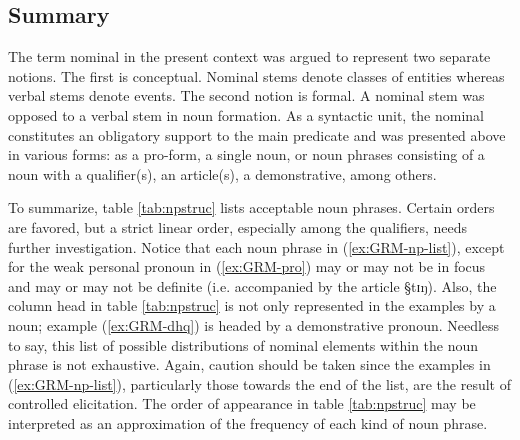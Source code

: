 \subsection{Summary}
\label{sec:GRM-NP-sum}

The term nominal in the present context was argued to represent two separate
notions. The first is  conceptual. Nominal stems denote classes of entities
whereas verbal stems denote events. The second notion is  formal. A nominal stem
was opposed to  a verbal stem in noun formation.  As a syntactic unit,  the
nominal  constitutes an obligatory support to the main predicate and was
presented above in  various forms:   as a pro-form, a single noun, or 
 noun phrases
consisting of a noun with a qualifier(s), an article(s), a demonstrative,  among
others.

To summarize, table \ref{tab:npstruc} lists acceptable
noun
phrases. Certain orders are
favored, but a strict linear order, especially among the qualifiers, needs 
further investigation.   Notice that each
noun phrase in (\ref{ex:GRM-np-list}), except for the weak personal pronoun in
(\ref{ex:GRM-pro}) may or may not be in focus and may or may not be definite
(i.e. accompanied by the article {\S tɪŋ}). Also,  the column
{\sc head} in table \ref{tab:npstruc} is not only represented in the
examples by a noun;  example (\ref{ex:GRM-dhq}) is headed by a demonstrative
pronoun. Needless to say, this list of possible distributions of nominal
elements
within the noun phrase is not exhaustive. Again, caution should be taken since
the examples in (\ref{ex:GRM-np-list}), particularly those towards the end of
the list, are the result of controlled elicitation. The order of appearance in 
table  \ref{tab:npstruc} may be   interpreted  as  an approximation of the 
frequency of each kind of noun phrase.








